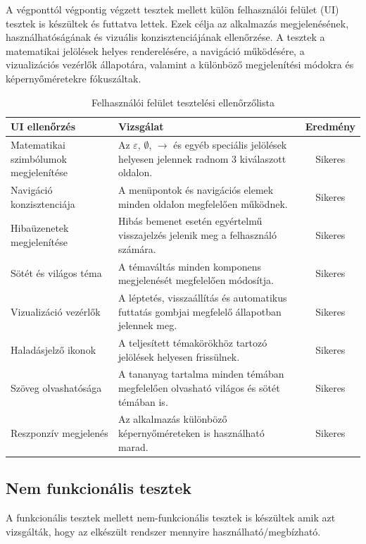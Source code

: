 A végponttól végpontig végzett tesztek mellett külön felhasználói felület (UI) tesztek is készültek és futtatva lettek. 
Ezek célja az alkalmazás megjelenésének, használhatóságának és vizuális konzisztenciájának ellenőrzése. 
A tesztek a matematikai jelölések helyes renderelésére, a navigáció működésére, a vizualizációs vezérlők állapotára, valamint a 
különböző megjelenítési módokra és képernyőméretekre fókuszáltak.
\begin{table}[H] \centering \small \begin{tabularx}{\textwidth}{|l|X|c|} \hline \textbf{UI ellenőrzés} & \textbf{Vizsgálat} & \textbf{Eredmény} \\ \hline 
Matematikai szimbólumok megjelenítése & Az $\varepsilon$, $\emptyset$, $\rightarrow$ és egyéb speciális jelölések helyesen jelennek radnom 3 kiválaszott oldalon. & Sikeres \\ \hline 
Navigáció konzisztenciája & A menüpontok és navigációs elemek minden oldalon megfelelően működnek. & Sikeres \\ \hline 
Hibaüzenetek megjelenítése & Hibás bemenet esetén egyértelmű visszajelzés jelenik meg a felhasználó számára. & Sikeres \\ \hline 
Sötét és világos téma & A témaváltás minden komponens megjelenését megfelelően módosítja. & Sikeres \\ \hline 
Vizualizáció vezérlők & A léptetés, visszaállítás és automatikus futtatás gombjai megfelelő állapotban jelennek meg. & Sikeres \\ \hline 
Haladásjelző ikonok & A teljesített témakörökhöz tartozó jelölések helyesen frissülnek. & Sikeres \\ \hline 
Szöveg olvashatósága & A tananyag tartalma minden témában megfelelően olvasható világos és sötét témában is. & Sikeres \\ \hline 
Reszponzív megjelenés & Az alkalmazás különböző képernyőméreteken is használható marad. & Sikeres \\ \hline 
\end{tabularx} 
\caption{Felhasználói felület tesztelési ellenőrzőlista} \label{tab:ui-tests} 
\end{table}

\subsection{Nem funkcionális tesztek}
A funkcionális tesztek mellett nem-funkcionális tesztek is készültek
amik azt vizsgálták, hogy az elkészült rendszer mennyire használható/megbízható.

